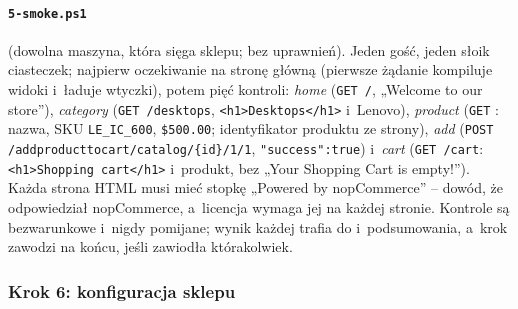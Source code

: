 \paragraph{\texttt{5-smoke.ps1}} (dowolna maszyna, która sięga sklepu; bez uprawnień).
Jeden gość, jeden słoik ciasteczek; najpierw oczekiwanie na stronę główną (pierwsze
żądanie kompiluje widoki i~ładuje wtyczki), potem pięć kontroli: \emph{home}
(\texttt{GET /}, „Welcome to our store”), \emph{category} (\texttt{GET /desktops},
\texttt{<h1>Desktops</h1>} i~Lenovo), \emph{product}
(\texttt{GET} : nazwa, SKU \texttt{LE\_IC\_600},
\texttt{\$500.00}; identyfikator produktu ze strony), \emph{add}
(\texttt{POST /addproducttocart/catalog/\{id\}/1/1}, \texttt{"success":true}) i~\emph{cart}
(\texttt{GET /cart}: \texttt{<h1>Shopping cart</h1>} i~produkt, bez „Your Shopping Cart is
empty!”). Każda strona HTML musi mieć stopkę „Powered by nopCommerce” -- dowód, że
odpowiedział nopCommerce, a~licencja wymaga jej na każdej stronie. Kontrole są
bezwarunkowe i~nigdy pomijane; wynik każdej trafia do  i~podsumowania,
a~krok zawodzi na końcu, jeśli zawiodła którakolwiek.


\subsubsection{Krok 6: konfiguracja sklepu}\label{sec:bench-krok6}

